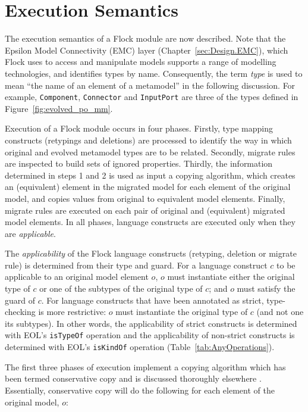 \section{Execution Semantics}
The execution semantics of a Flock module are now described. Note that the Epsilon Model Connectivity (EMC) layer (Chapter~\ref{sec:Design.EMC}), which Flock uses to access and manipulate models supports a range of modelling technologies, and identifies types by name. Consequently, the term \emph{type} is used to mean ``the name of an element of a metamodel'' in the following discussion. For example, \texttt{Co\-mp\-on\-e\-nt}, \texttt{Co\-nn\-ec\-t\-or} and \texttt{In\-p\-utPo\-rt} are three of the types defined in Figure~\ref{fig:evolved_po_mm}.

Execution of a Flock module occurs in four phases. Firstly, type mapping constructs (retypings and deletions) are processed to identify the way in which original and evolved metamodel types are to be related. Secondly, migrate rules are inspected to build sets of ignored properties. Thirdly, the information determined in steps 1 and 2 is used as input a copying algorithm, which creates an (equivalent) element in the migrated model for each element of the original model, and copies values from original to equivalent model elements. Finally, migrate rules are executed on each pair of original and (equivalent) migrated model elements. In all phases, language constructs are executed only when they are \emph{applicable}.

The \emph{applicability} of the Flock language constructs (retyping, deletion or migrate rule) is determined from their type and guard. For a language construct $c$ to be applicable to an original model element $o$, $o$ must instantiate either the original type of $c$ or one of the subtypes of the original type of $c$; and $o$ must satisfy the guard of $c$. For language constructs that have been annotated as strict, type-checking is more restrictive: $o$ must instantiate the original type of $c$ (and not one its subtypes). In other words, the applicability of strict constructs is determined with EOL's \texttt{isTypeOf} operation and the applicability of non-strict constructs is determined with EOL's \texttt{isKindOf} operation (Table~\ref{tab:AnyOperations}).

The first three phases of execution implement a copying algorithm which has been termed conservative copy and is discussed thoroughly elsewhere \cite{rose12flock}. Essentially, conservative copy will do the following for each element of the original model, $o$:

